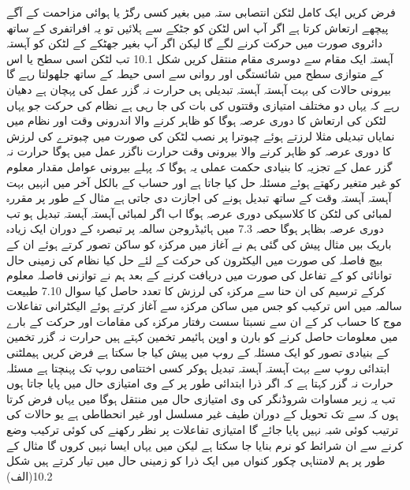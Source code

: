 
فرض کریں ایک کامل لٹکن انتصابی ستہ میں بغیر کسی رگڑ یا ہوائی مزاحمت کے آگے پیچھے ارتعاش کرتا ہے اگر آپ اس لٹکن کو جٹکے سے ہلائیں تو یہ افراتفری کے ساتھ دائروی صورت میں حرکت کرنے لگے گا لیکن اگر آپ بغیر جھٹکے کے لٹکن کو آہستہ آہستہ ایک مقام سے دوسری مقام منتقل کریں شکل 10.1 تب لٹکن اسی سطح یا اس کے متوازی سطح میں شائستگی اور روانی سے اسی حیطہ کے ساتھ جلھولتا رہے گا بیرونی حالات کی بہت آہستہ آہستہ تبدیلی ہی حرارت نہ گزر عمل کی پہچان ہے دھیان رہے کہ یہاں دو مختلف امتیازی وقتتوں کی بات کی جا رہی ہے نظام کی حرکت جو یہاں لٹکن کی ارتعاش کا دوری عرصہ ہوگا کو ظاہر کرنے والا اندرونی وقت  اور نظام میں نمایاں تبدیلی مثلا لرزتے ہوئے چبوترا پر نصب لٹکن کی صورت میں چبوترے کی لرزش کا دوری عرصہ کو ظاہر کرنے والا بیرونی وقت  حرارت ناگزر عمل میں  ہوگا حرارت نہ گزر عمل کے تجزیہ کا بنیادی حکمت عملی یہ ہوگا کہ پہلے بیرونی عوامل مقدار معلوم کو غیر متغیر رکھتے ہوئے مسئلہ حل کیا جاتا ہے اور حساب کے بالکل آخر میں انہیں بہت آہستہ آہستہ وقت کے ساتھ تبدیل ہونے کی اجازت دی جاتی ہے مثال کے طور پر مقررہ لمبائی  کی لٹکن کا کلاسیکی دوری عرصہ  ہوگا اب اگر لمبائی آہستہ آہستہ تبدیل ہو تب دوری عرصہ  بظاہر   ہوگا حصہ 7.3 میں ہائیڈروجن سالمہ پر تبصرہ کے دوران ایک زیادہ باریک بیں مثال پیش کی گئی ہم نے آغاز میں مرکزہ کو ساکن تصور کرتے ہوئے ان کے بیچ فاصلہ  کی صورت میں الیکٹرون کی حرکت کے لئے حل کیا نظام کی زمینی حال توانائی کو  کے تفاعل کی صورت میں دریافت کرنے کے بعد ہم نے توازنی فاصلہ معلوم کرکے ترسیم کی ان حنا سے مرکزہ کی لرزش کا تعدد حاصل کیا سوال 7.10 طبیعت سالمہ میں اس ترکیب کو جس میں ساکن مرکزہ سے آغاز کرتے ہوئے الیکٹرانی تفاعلات موج کا حساب کر کے ان سے نسبتا سست رفتار مرکزہ کی مقامات اور حرکت کے بارے میں معلومات حاصل کرنے کو بارن و اوپن ہائيمر تخمین کہتے ہیں حرارت نہ گزر تخمین کے بنیادی تصور کو ایک مسئلہ کے روپ میں پیش کیا جا سکتا ہے فرض کریں ہيملٹنی ابتدائی روپ  سے بہت آہستہ آہستہ تبدیل ہوکر کسی اختتامی روپ   تک پہنچتا ہے مسئلہ حرارت نہ گزر کہتا ہے کہ اگر ذرا ابتدائی طور پر  کے  وی امتیازی حال میں پایا جاتا ہوں تب یہ زیر مساوات شروڈنگر  کی  وی امتیازی حال میں منتقل ہوگا میں یہاں فرض کرتا ہوں کہ  سے  تک تحویل کے دوران طیف غیر مسلسل اور غیر انحطاطی ہے یو حالات کی ترتیب کوئی شبہ نہیں پایا جائے گا امتیازی تفاعلات پر نظر رکھنے کی کوئی ترکیب وضع کرنے سے ان شرائط کو نرم بنایا جا سکتا ہے لیکن میں یہاں ایسا نہیں کروں گا مثال کے طور پر ہم لامتناہی چکور کنواں میں ایک ذرا کو زمینی حال میں تیار کرتے ہیں شکل 10.2(الف) 
